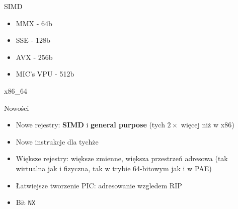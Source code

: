 \begin{frame}{SIMD}
	\begin{itemize}
		\item MMX - 64b
		\item SSE - 128b
		\item AVX - 256b
		\item MIC's VPU - 512b
	\end{itemize}
\end{frame}
\begin{frame}[fragile]{x86\_64}
	\begin{block}{Nowości}
		\begin{itemize}
			\item Nowe rejestry: \textbf{SIMD} i \textbf{general purpose} (tych $2\times$ więcej niż w x86)
			\item Nowe instrukcje dla tychże
			\item Większe rejestry: większe zmienne, większa przestrzeń adresowa (tak wirtualna jak i fizyczna, tak w trybie 64-bitowym jak i w PAE)
			\item Łatwiejsze tworzenie PIC: adresowanie wzgledem RIP
			\item Bit \texttt{NX}
		\end{itemize}
	\end{block}
\end{frame}
